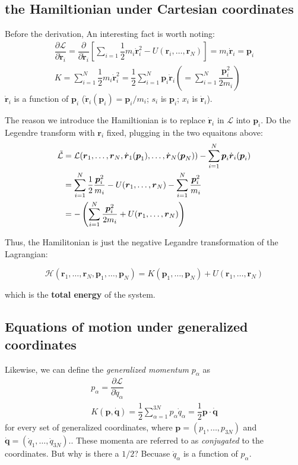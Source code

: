 \documentclass[
  10pt,
  twoside,
  openany,
  b5paper, %
  colorscheme = bootstrap-v4, %
]{qyxf-book}
\newcommand{\p}[2]{\dfrac{\partial #1}{\partial #2}}
\newcommand{\vr}{\boldsymbol{r}}
\newcommand{\vp}{\boldsymbol{p}}
\newcommand{\vq}{\boldsymbol{q}}
\newcommand{\dvr}{\dot{\vr}}
\newcommand{\dvq}{\dot{\vq}}
\newcommand{\half}{\dfrac{1}{2}}
\newcommand{\sumin}{\sum_{i=1}^N}
\newcommand{\suman}{\sum_{\alpha=1}^{3N}}
\newcommand{\lag}{\mathcal{L}} %
\newcommand{\ham}{\mathcal{H}} %
\begin{document}
\vspace{1em}
\subsection{the Hamiltionian under Cartesian coordinates}

Before the derivation, An interesting fact is worth noting:
\begin{gather}
	\p{\lag}{\dvr_i}=\p{}{\dvr_i}\left[\sum_{i=1}\half m_i\dvr_i^2-U(\vr_i,\dots,\vr_N)\right]=m_i\dvr_i=\vp_i\\
	K=\sumin\half m_i\dvr_i^2=\half\sumin\vp_i\dvr_i\left(=\sumin\dfrac{\vp_i^2}{2m_i}\right)
\end{gather}
$\dvr_i$ is a function of $\vp_i$ ($\dvr_i(\vp_i)=\vp_i/m_i$; $s_i$ is $\vp_i$; $x_i$ is $\dvr_i$). 

The reason we introduce the Hamiltionian is to replace $\dvr_i$ in $\lag$ into $\vp_i$. Do the Legendre transform with $\vr_i$ fixed, plugging in the two equaitons above:
\begin{align}
	\tilde{\lag}&=\lag(\vr_1,\dots,\vr_N,\dvr_1(\vp_1),\dots,\dvr_N(\vp_N))-\sumin \vp_i\dvr_i(\vp_i) \notag\\
	&=\sumin\half \dfrac{\vp_i^2}{m_i}-U(\vr_1,\dots,\vr_N)-\sumin \dfrac{\vp_i^2}{m_i} \notag\\
	&=-\left(\sumin \dfrac{\vp_i^2}{2m_i}+U(\vr_1,\dots,\vr_N)\right)
\end{align}

Thus, the Hamilitonian is just the negative Legandre transformation of the Lagrangian:
\begin{tcolorbox}
	\begin{equation}
		\ham(\vr_1,\dots,\vr_N,\vp_1,\dots,\vp_N)=K(\vp_1,\dots,\vp_N)+U(\vr_1,\dots,\vr_N)
	\end{equation}
\end{tcolorbox}
which is the \textbf{total energy} of the system.

\subsection{Equations of motion under generalized coordinates}

Likewise, we can define the \textit{generalized momentum} $p_\alpha$ as
\begin{gather}
	p_\alpha=\p{\lag}{\dot{q}_\alpha} \label{eq:palpha}\\
	K(\vp,\dvq)=\half\suman p_\alpha\dot{q}_\alpha=\half\vp\cdot\dvq \label{eq:kinetic-general}
\end{gather}
for every set of generalized coordinates, where $\vp=(p_1,\dots,p_{3N})$ and $\dvq=(\dot{q}_1,\dots,\dot{q}_{3N})$.. These momenta are referred to as \textit{conjugated} to the coordinates. But why is there a $1/2$? Becuase $\dot{q}_\alpha$ is a function of $p_\alpha$.
\end{document}
